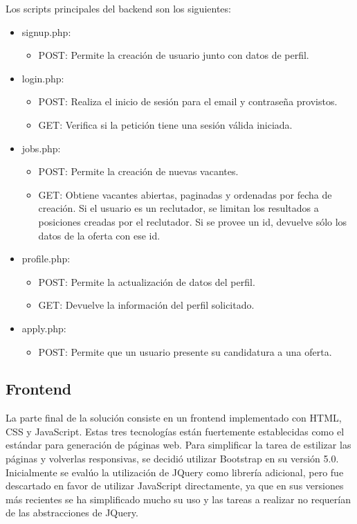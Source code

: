 \documentclass[a4paper]{article}
\begin{document}
Los scripts principales del backend son los siguientes:
\begin{itemize}
    \item signup.php:
        \begin{itemize}
            \item POST: Permite la creación de usuario junto con datos de perfil.
        \end{itemize}
    \item login.php:
        \begin{itemize}
            \item POST: Realiza el inicio de sesión para el email y
                contraseña provistos.
            \item GET: Verifica si la petición tiene una sesión válida iniciada.
        \end{itemize}
    \item jobs.php:
        \begin{itemize}
            \item POST: Permite la creación de nuevas vacantes.
            \item GET: Obtiene vacantes abiertas, paginadas y ordenadas por
                fecha de creación. Si el usuario es un reclutador, se limitan
                los resultados a posiciones creadas por el reclutador. Si se
                provee un id, devuelve sólo los datos de la oferta con ese id.
        \end{itemize}
    \item profile.php:
        \begin{itemize}
            \item POST: Permite la actualización de datos del perfil.
            \item GET: Devuelve la información del perfil solicitado.
        \end{itemize}
    \item apply.php:
        \begin{itemize}
            \item POST: Permite que un usuario presente su candidatura a una
                oferta.
        \end{itemize}
\end{itemize}

\subsection{Frontend}

La parte final de la solución consiste en un frontend implementado con HTML,
CSS y JavaScript. Estas tres tecnologías están fuertemente establecidas como el
estándar para generación de páginas web. Para simplificar la tarea de estilizar
las páginas y volverlas responsivas, se decidió utilizar Bootstrap en su
versión 5.0. Inicialmente se evalúo la utilización de JQuery como librería
adicional, pero fue descartado en favor de utilizar JavaScript directamente,
ya que en sus versiones más recientes se ha simplificado mucho su uso y las
tareas a realizar no requerían de las abstracciones de JQuery.
\end{document}
